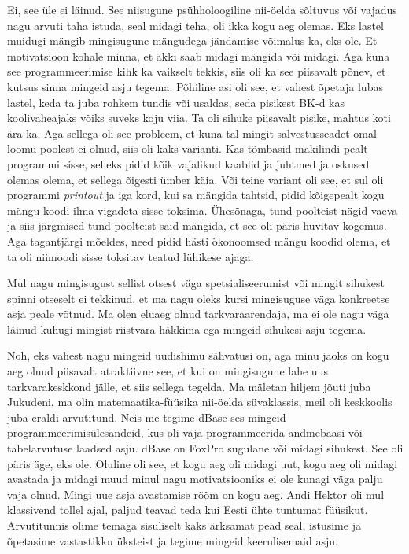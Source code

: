 Ei, see üle ei läinud. See niisugune psühholoogiline nii-öelda sõltuvus või 
vajadus nagu arvuti taha istuda, seal midagi teha, oli ikka kogu aeg olemas. 
Eks lastel muidugi  mängib mingisugune mängudega jändamise võimalus ka,  eks 
ole. Et motivatsioon kohale minna, et äkki saab midagi mängida või midagi. Aga 
kuna see programmeerimise  kihk ka vaikselt tekkis, siis oli  ka see 
piisavalt põnev, et  kutsus sinna mingeid asju tegema. Põhiline asi oli see, 
et vahest õpetaja lubas lastel, keda ta juba rohkem tundis või 
usaldas, seda pisikest BK-d kas koolivaheajaks võiks suveks koju viia. Ta 
oli sihuke  piisavalt pisike, mahtus koti ära ka. Aga sellega oli see probleem, 
et kuna tal mingit salvestusseadet omal loomu poolest ei olnud, siis oli  
kaks varianti. Kas tõmbasid makilindi pealt programmi sisse, selleks pidid 
kõik vajalikud kaablid ja juhtmed ja oskused olemas olema, et sellega õigesti 
ümber käia. Või teine variant oli see, et sul oli programmi \emph{printout} ja iga 
kord, kui sa mängida tahtsid, pidid kõigepealt kogu mängu koodi ilma 
vigadeta sisse toksima. Ühesõnaga, tund-poolteist nägid vaeva ja siis 
järgmised tund-poolteist said mängida, et see oli päris huvitav kogemus. Aga 
tagantjärgi mõeldes, need pidid hästi ökonoomsed mängu koodid olema, et ta oli 
niimoodi sisse toksitav teatud lühikese ajaga. 


Mul nagu mingisugust sellist otsest väga spetsialiseerumist või mingit sihukest 
spinni otseselt ei tekkinud, et ma nagu oleks kursi mingisuguse väga konkreetse 
asja peale võtnud. Ma olen eluaeg olnud tarkvaraarendaja,  ma ei ole nagu väga 
läinud kuhugi mingist riistvara häkkima ega mingeid sihukesi asju tegema. 


Noh, eks vahest nagu mingeid uudishimu sähvatusi on, aga minu jaoks on kogu aeg 
olnud piisavalt atraktiivne see, et kui on mingisugune lahe uus  
tarkvarakeskkond jälle, et siis sellega tegelda. Ma mäletan hiljem jõuti juba 
Jukudeni, ma olin matemaatika-füüsika nii-öelda 
süvaklassis, meil oli keskkoolis juba eraldi arvutitund. Neis me tegime 
dBase-ses mingeid programmeerimisülesandeid, kus oli vaja programmeerida
andmebaasi või tabelarvutuse laadsed asju. dBase on FoxPro 
sugulane või midagi sihukest. See oli päris äge, eks ole. Oluline oli see, et 
kogu aeg oli midagi uut, kogu aeg oli midagi avastada ja midagi muud minul nagu 
 motivatsiooniks ei ole kunagi väga palju vaja olnud.  Mingi uue 
asja avastamise rõõm on kogu aeg. Andi Hektor oli mul 
klassivend tollel ajal, paljud teavad teda kui Eesti ühte tuntumat füüsikut. 
Arvutitunnis olime temaga sisuliselt kaks ärksamat pead seal, istusime ja 
õpetasime vastastikku üksteist ja tegime mingeid keerulisemaid asju. 

